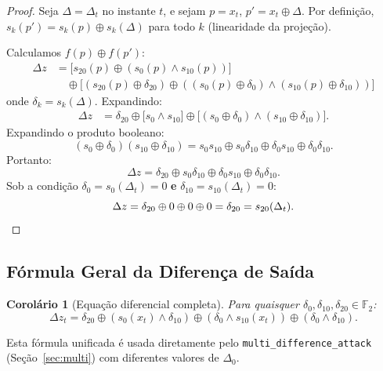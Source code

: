 \documentclass[12pt,a4paper]{article}
\newtheorem{corollary}[theorem]{Corolário}
\theoremstyle{definition}
\theoremstyle{remark}
\newcommand{\GFtwo}{\mathbb{F}_2}
\newcommand{\xor}{\oplus}
\newcommand{\AND}{\wedge}
\newcommand{\filter}{f}
\newcommand{\ks}{z}
\begin{document}
\begin{proof}
  Seja $\Delta = \Delta_t$ no instante $t$, e sejam $p = x_t$, $p' = x_t \xor
  \Delta$. Por definição, $s_k(p') = s_k(p) \xor s_k(\Delta)$ para todo $k$
  (linearidade da projeção).

  Calculamos $\filter(p) \xor \filter(p')$:
  \begin{align*}
    \Delta\ks &= \bigl[s_{20}(p) \xor (s_0(p) \AND s_{10}(p))\bigr] \\
              &\quad \xor \bigl[(s_{20}(p)\xor\delta_{20}) \xor
                              ((s_0(p)\xor\delta_0) \AND (s_{10}(p)\xor\delta_{10}))
                              \bigr]
  \end{align*}
  onde $\delta_k = s_k(\Delta)$. Expandindo:
  \begin{align*}
    \Delta\ks &= \delta_{20} \xor
                 \bigl[s_0 \AND s_{10}\bigr] \xor
                 \bigl[(s_0\xor\delta_0) \AND (s_{10}\xor\delta_{10})\bigr].
  \end{align*}
  Expandindo o produto booleano:
  \[
    (s_0\xor\delta_0)(s_{10}\xor\delta_{10}) =
      s_0 s_{10} \xor s_0\delta_{10} \xor \delta_0 s_{10} \xor \delta_0\delta_{10}.
  \]
  Portanto:
  \[
    \Delta\ks = \delta_{20} \xor s_0\delta_{10} \xor \delta_0 s_{10}
                \xor \delta_0\delta_{10}.
  \]
  Sob a condição $\delta_0 = s_0(\Delta_t) = 0$ \textbf{e} $\delta_{10} =
  s_{10}(\Delta_t) = 0$:
  \[
    \Delta\ks = \delta_{20} \xor 0 \xor 0 \xor 0 = \delta_{20} = s_{20}(\Delta_t). \qedhere
  \]
\end{proof}

\subsection{Fórmula Geral da Diferença de Saída}

\begin{corollary}[Equação diferencial completa]
  \label{cor:full-diff}
  Para quaisquer $\delta_0, \delta_{10}, \delta_{20} \in \GFtwo$:
  \[
    \Delta\ks_t = \delta_{20} \xor (s_0(x_t) \AND \delta_{10})
                             \xor (\delta_0 \AND s_{10}(x_t))
                             \xor (\delta_0 \AND \delta_{10}).
  \]
\end{corollary}

Esta fórmula unificada é usada diretamente pelo \texttt{multi\_difference\_attack}
(Seção~\ref{sec:multi}) com diferentes valores de $\Delta_0$.

\end{document}
